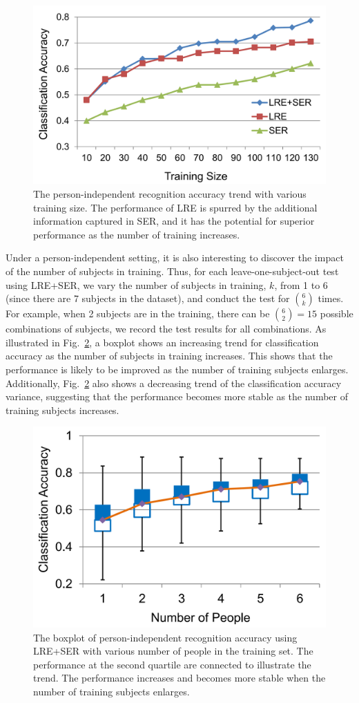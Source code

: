 \documentclass[journal]{IEEEtran}
\begin{document}
\begin{figure}[htbp]
	\centering
		\includegraphics[width=.7\columnwidth]{pics/effect_training_size.png}
	\caption{The person-independent recognition accuracy trend with various training size. The performance of LRE is spurred by the additional information captured in SER, and it has the potential for superior performance as the number of training increases. }
	\label{fig:effect_training_size}
\end{figure}


Under a person-independent setting, it is also interesting to discover the impact of the number of subjects in training. Thus, for each leave-one-subject-out test using LRE+SER, we vary the number of subjects in training, $k$, from 1 to 6 (since there are 7 subjects in the dataset), and conduct the test for ${6 \choose k}$ times. For example, when 2 subjects are in the training, there can be ${6 \choose 2}=15$ possible combinations of subjects, we record the test results for all combinations. As illustrated in Fig.~\ref{fig:effect_people_num}, a boxplot shows an increasing trend for classification accuracy as the number of subjects in training increases. This shows that the performance is likely to be improved as the number of training subjects enlarges. Additionally, Fig.~\ref{fig:effect_people_num} also shows a decreasing trend of the classification accuracy variance, suggesting that the performance becomes more stable as the number of training subjects increases. 


\begin{figure}[htbp]
	\centering
		\includegraphics[width=.65\columnwidth]{pics/effect_people_num.png}
	\caption{The boxplot of person-independent recognition accuracy using LRE+SER with various number of people in the training set. The performance at the second quartile are connected to illustrate the trend. The performance increases and becomes more stable when the number of training subjects enlarges.}
	\label{fig:effect_people_num}
\end{figure}
\end{document}

